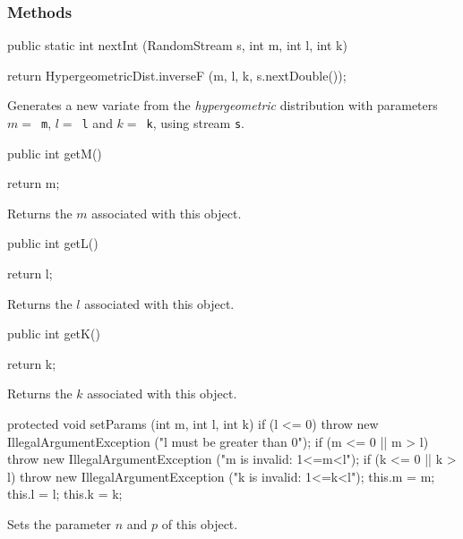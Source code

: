 \subsubsection* {Methods}
\begin{code}

   public static int nextInt (RandomStream s, int m, int l, int k)\begin{hide} {
      return HypergeometricDist.inverseF (m, l, k, s.nextDouble());
   }\end{hide}
\end{code}
\begin{tabb}
   Generates a new variate from the {\em hypergeometric\/} distribution with
   parameters $m = $~\texttt{m}, $l = $~\texttt{l} and $k = $~\texttt{k},
   using stream \texttt{s}.
\end{tabb}
\begin{code}

   public int getM()\begin{hide} {
      return m;
   }\end{hide}
\end{code}
\begin{tabb}
   Returns the $m$ associated with this object.
\end{tabb}
\begin{code}

   public int getL()\begin{hide} {
      return l;
   }\end{hide}
\end{code}
\begin{tabb}
   Returns the $l$ associated with this object.
\end{tabb}
\begin{code}

   public int getK()\begin{hide} {
      return k;
   }\end{hide}
\end{code}
\begin{tabb}
   Returns the $k$ associated with this object.
\end{tabb}
\begin{hide}\begin{code}

   protected void setParams (int m, int l, int k) {
      if (l <= 0)
         throw new IllegalArgumentException ("l must be greater than 0");
      if (m <= 0 || m > l)
         throw new IllegalArgumentException ("m is invalid: 1<=m<l");
      if (k <= 0 || k > l)
         throw new IllegalArgumentException ("k is invalid: 1<=k<l");
      this.m = m;
      this.l = l;
      this.k = k;
   }
\end{code}
\begin{tabb} Sets the parameter $n$ and $p$ of this object.
\end{tabb}
\begin{code}
}
\end{code}
\end{hide}
